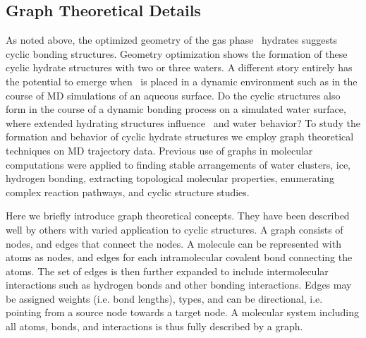 \documentclass{article}
\begin{document}
\subsection {Graph Theoretical Details}

As noted above, the optimized geometry of the gas phase \suldiox~hydrates suggests cyclic bonding structures. Geometry optimization shows the formation of these cyclic hydrate structures with two or three waters. A different story entirely has the potential to emerge when \suldiox~is placed in a dynamic environment such as in the course of MD simulations of an aqueous surface. Do the cyclic structures also form in the course of a dynamic bonding process on a simulated water surface, where extended hydrating structures influence \suldiox~and water behavior? To study the formation and behavior of cyclic hydrate structures we employ graph theoretical techniques on MD trajectory data. Previous use of graphs in molecular computations were applied to finding stable arrangements of water clusters, ice, hydrogen bonding, extracting topological molecular properties, enumerating complex reaction pathways, and cyclic structure studies.\cite{Anick2002, Huber2007, Radhakrishnan1991, Shi2005, Garcia2004, McDonald1998, Sinanogly1975}

Here we briefly introduce graph theoretical concepts. They have been described well by others with varied application to cyclic structures.\cite{Tutte1984, Balakrishnan2000, Harary1973, Huber2007, Garcia2004, Dury2001} A graph consists of nodes, and edges that connect the nodes. A molecule can be represented with atoms as nodes, and edges for each intramolecular covalent bond connecting the atoms. The set of edges is then further expanded to include intermolecular interactions such as hydrogen bonds and other bonding interactions. Edges may be assigned weights (i.e. bond lengths), types, and can be directional, i.e. pointing from a source node towards a target node. A molecular system including all atoms, bonds, and interactions is thus fully described by a graph. 
\end{document}
